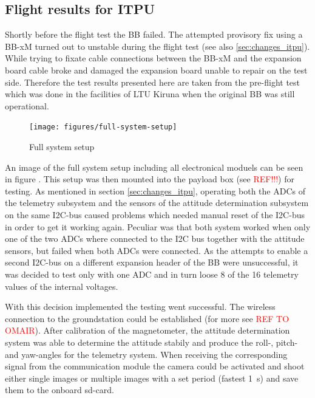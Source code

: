 \subsection{Flight results for ITPU}

Shortly before the flight test the BB failed. The attempted provisory fix using a BB-xM turned out to unstable during the flight test (see also \ref{sec:changes_itpu}). While trying to fixate cable connections between the BB-xM and the expansion board cable broke and damaged the expansion board unable to repair on the test side. Therefore the test results presented here are taken from the pre-flight test which was done in the facilities of LTU Kiruna when the original BB was still operational.

\begin{figure}
\centering
\texttt{[image: figures/full-system-setup]}
\caption{Full system setup}
\label{fig:FlightTest1_1}
\end{figure}

An image of the full system setup including all electronical moduels can be seen in figure . This setup was then mounted into the payload box (see \textcolor{red}{REF!!!}) for testing. As mentioned in section \ref{sec:changes_itpu}, operating both the ADCs of the telemetry subsystem and the sensors of the attitude determination subsystem on the same I2C-bus caused problems which needed manual reset of the I2C-bus in order to get it working again. Peculiar was that both system worked when only one of the two ADCs where connected to the I2C bus together with the attitude sensors, but failed when both ADCs were connected. As the attempts to enable a second I2C-bus on a different expansion header of the BB were unsuccessful, it was decided to test only with one ADC and in turn loose 8 of the 16 telemetry values of the internal voltages. 

With this decision implemented the testing went successful. The wireless connection to the groundstation could be established (for more see \textcolor{red}{REF TO OMAIR}). After calibration of the magnetometer, the attitude determination system was able to determine the attitude stabily and produce the roll-, pitch- and yaw-angles for the telemetry system. When receiving the corresponding signal from the communication module the camera could be activated and shoot either single images or multiple images with a set period (fastest 1~s) and save them to the onboard sd-card.  


